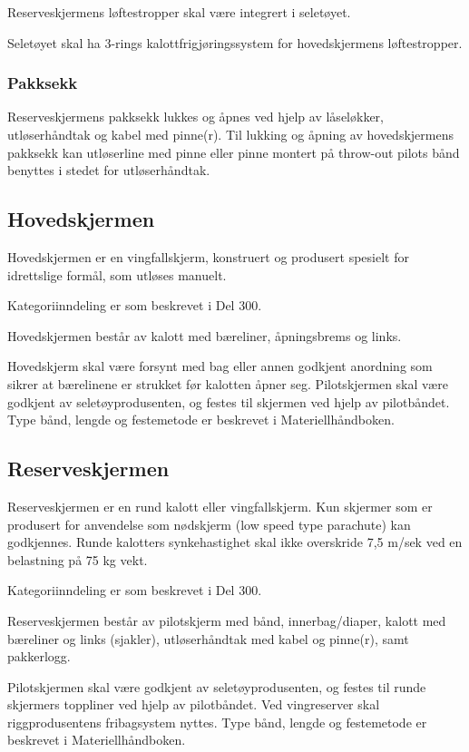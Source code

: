 Reserveskjermens løftestropper skal være integrert i seletøyet.

Seletøyet skal ha 3-rings kalottfrigjøringssystem for hovedskjermens løftestropper.

\subsubsection{Pakksekk}
Reserveskjermens pakksekk lukkes og åpnes ved hjelp av låseløkker, utløserhåndtak og kabel med pinne(r). Til lukking og åpning av hovedskjermens pakksekk kan utløserline med pinne eller pinne montert på throw-out pilots bånd benyttes i stedet for utløserhåndtak.

\subsection{Hovedskjermen}
Hovedskjermen er en vingfallskjerm, konstruert og produsert spesielt for idrettslige formål, som utløses manuelt.

Kategoriinndeling er som beskrevet i Del 300.

Hovedskjermen består av kalott med bæreliner, åpningsbrems og links.

Hovedskjerm skal være forsynt med bag eller annen godkjent anordning som sikrer at bærelinene er strukket før kalotten åpner seg. Pilotskjermen skal være godkjent av seletøyprodusenten, og festes til skjermen ved hjelp av pilotbåndet. Type bånd, lengde og festemetode er beskrevet i Materiellhåndboken.

\subsection{Reserveskjermen}
Reserveskjermen er en rund kalott eller vingfallskjerm. Kun skjermer som er produsert for anvendelse som nødskjerm (low speed type parachute) kan godkjennes. Runde kalotters synkehastighet skal ikke overskride 7,5 m/sek ved en belastning på 75 kg vekt.

Kategoriinndeling er som beskrevet i Del 300.

Reserveskjermen består av pilotskjerm med bånd, innerbag/diaper, kalott med bæreliner og links (sjakler), utløserhåndtak med kabel og pinne(r), samt pakkerlogg.

Pilotskjermen skal være godkjent av seletøyprodusenten, og festes til runde skjermers toppliner ved hjelp av pilotbåndet. Ved vingreserver skal riggprodusentens fribagsystem nyttes. Type bånd, lengde og festemetode er beskrevet i Materiellhåndboken.

